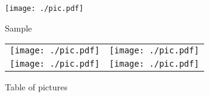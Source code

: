 \documentclass[a4paper]{article}
\begin{document}
\begin{figure}[h]
  \centering
  \texttt{[image: ./pic.pdf]}%
  \caption{Sample}
  \label{fig:pdf}
\end{figure}

\begin{figure}[h!]
  \begin{tabular}{cc}
    \begin{minipage}{0.5\hsize}
      \centering
      \texttt{[image: ./pic.pdf]}
    \end{minipage} &
    \begin{minipage}{0.5\hsize}
      \centering
      \texttt{[image: ./pic.pdf]}
    \end{minipage} \\
    \begin{minipage}{0.5\hsize}
      \centering
      \texttt{[image: ./pic.pdf]}
    \end{minipage} &
    \begin{minipage}{0.5\hsize}
      \centering
      \texttt{[image: ./pic.pdf]}
    \end{minipage} \\
  \end{tabular}
  \caption{Table of pictures}
  \label{fig:table}
\end{figure}
\end{document}
